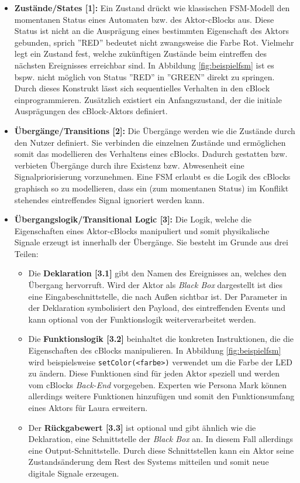 \begin{itemize}
    \item \textbf{Zustände/States [1]:} Ein Zustand drückt wie klassischen \ac{FSM}-Modell den momentanen Status eines Automaten bzw. des Aktor-cBlocks aus. Diese Status ist nicht an die Ausprägung eines bestimmten Eigenschaft des Aktors gebunden, sprich ''RED'' bedeutet nicht zwangsweise die Farbe Rot. Vielmehr legt ein Zustand fest, welche zukünftigen Zustände beim eintreffen des nächsten Ereignisses erreichbar sind. In Abbildung \ref{fig:beispielfsm} ist es bspw. nicht möglich von Status ''RED'' in ''GREEN'' direkt zu springen. Durch dieses Konstrukt lässt sich sequentielles Verhalten in den cBlock einprogrammieren. Zusätzlich existiert ein Anfangszustand, der die initiale Ausprägungen des cBlock-Aktors definiert.
    \item \textbf{Übergänge/Transitions [2]:} Die Übergänge werden wie die Zustände durch den Nutzer definiert. Sie verbinden die einzelnen Zustände und ermöglichen somit das modellieren des Verhaltens eines cBlocks. Dadurch gestatten bzw. verbieten Übergänge durch ihre Existenz bzw. Abwesenheit eine Signalpriorisierung vorzunehmen. Eine \ac{FSM} erlaubt es die Logik des cBlocks graphisch so zu modellieren, dass ein (zum momentanen Status) im Konflikt stehendes eintreffendes Signal ignoriert werden kann.
    \item \textbf{Übergangslogik/Transitional Logic [3]:} Die Logik, welche die Eigenschaften eines Aktor-cBlocks manipuliert und somit physikalische Signale erzeugt ist innerhalb der Übergänge. Sie besteht im Grunde aus drei Teilen:
    \begin{itemize}
        \item Die \textbf{Deklaration [3.1]} gibt den Namen des Ereignisses an, welches den Übergang hervorruft. Wird der Aktor als \textit{Black Box} dargestellt ist dies eine Eingabeschnittstelle, die nach Außen sichtbar ist. Der Parameter in der Deklaration symbolisiert den Payload, des eintreffenden Events und kann optional von der Funktionslogik weiterverarbeitet werden.
        \item Die \textbf{Funktionslogik [3.2]} beinhaltet die konkreten Instruktionen, die die Eigenschaften des cBlocks manipulieren. In Abbildung \ref{fig:beispielfsm} wird beispielsweise \texttt{setColor(<farbe>)} verwendet um die Farbe der LED zu ändern. Diese Funktionen sind für jeden Aktor speziell und werden vom cBlocks \textit{Back-End} vorgegeben. Experten wie Persona Mark können allerdings weitere Funktionen hinzufügen und somit den Funktionsumfang eines Aktors für Laura erweitern.
        \item Der \textbf{Rückgabewert [3.3]} ist optional und gibt ähnlich wie die Deklaration, eine Schnittstelle der \textit{Black Box} an. In diesem Fall allerdings eine Output-Schnittstelle. Durch diese Schnittstellen kann ein Aktor seine Zustandsänderung dem Rest des Systems mitteilen und somit neue digitale Signale erzeugen. 
    \end{itemize}
\end{itemize}

